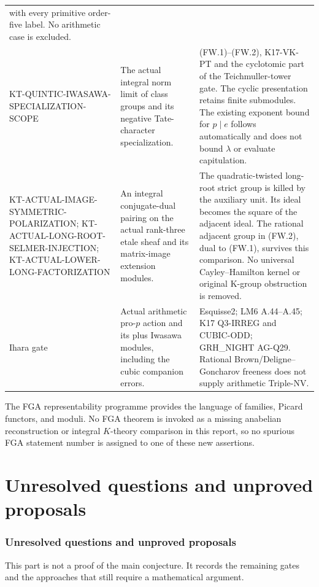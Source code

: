 \documentclass[11pt,a4paper]{article}
\theoremstyle{definition}
\begin{document}
\begin{longtable}{>{\raggedright\arraybackslash}p{}
>{\raggedright\arraybackslash}p{}
>{\raggedright\arraybackslash}p{}}
with every primitive order-five label. No arithmetic case is excluded.\\
KT-QUINTIC-IWASAWA-SPECIALIZATION-SCOPE &
The actual integral norm limit of class groups and its
negative Tate-character specialization. &
(FW.1)--(FW.2), K17-VK-PT and the cyclotomic part of the
Teichmuller-tower gate. The cyclic presentation retains finite
submodules. The existing exponent bound for $p\mid e$ follows
automatically and does not bound $\lambda$ or evaluate capitulation.\\
KT-ACTUAL-IMAGE-SYMMETRIC-POLARIZATION;
KT-ACTUAL-LONG-ROOT-SELMER-INJECTION;
KT-ACTUAL-LOWER-LONG-FACTORIZATION &
An integral conjugate-dual pairing on the actual rank-three
etale sheaf and its matrix-image extension modules. &
The quadratic-twisted long-root strict group is killed by
the auxiliary unit. Its ideal becomes the square of the
adjacent ideal. The rational adjacent group in (FW.2),
dual to (FW.1), survives this comparison. No universal
Cayley--Hamilton kernel or original K-group obstruction is removed.\\
Ihara gate &
Actual arithmetic pro-$p$ action and its plus Iwasawa modules,
including the cubic companion errors. &
Esquisse2; LM6 A.44--A.45; K17 Q3-IRREG and CUBIC-ODD;
GRH\_NIGHT AG-Q29. Rational Brown/Deligne--Goncharov
freeness does not supply arithmetic Triple-NV.\\
\bottomrule
\end{longtable}
\normalsize

The FGA representability programme provides the language of
families, Picard functors, and moduli. No FGA theorem is
invoked as a missing anabelian reconstruction or integral
$K$-theory comparison in this report, so no spurious FGA
statement number is assigned to one of these new assertions.


\part{Unresolved questions and unproved proposals}

\section{Unresolved questions and unproved proposals}

This part is not a proof of the main conjecture. It records the
remaining gates and the approaches that still require a
mathematical argument.
\end{document}
